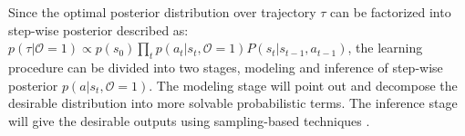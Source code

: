 \documentclass{article} %
\theoremstyle{plain}
\theoremstyle{definition}
\theoremstyle{remark}
\newcommand{\opt}{\mathcal{O}}
\begin{document}
{%












Since the optimal posterior distribution over trajectory $\tau$ can be factorized into step-wise posterior described as: $p(\tau|\mathcal{O}=1)\propto p(s_0)\prod_t p(a_t|s_t, \mathcal{O}=1)P(s_t|s_{t-1},a_{t-1})$, the learning procedure can be divided into two stages, modeling and inference of step-wise posterior $p(a|s_t, \mathcal{O}=1)$. The modeling stage will point out and decompose the desirable distribution into more solvable probabilistic terms. The inference stage will give the desirable outputs using sampling-based techniques \citep{korbak2022rl}.

}
\end{document}

